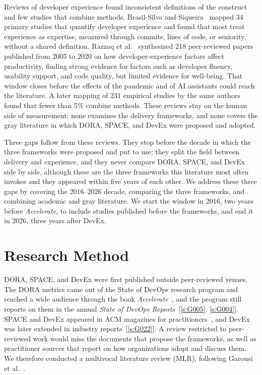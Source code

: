 \documentclass[preprint,number]{elsarticle}
\newcommand{\refG}[1]{\ref{s:#1}}
\begin{document}
Reviews of developer experience found inconsistent definitions of the construct and few studies that combine methods. Brasil-Silva and Siqueira~\cite{P0476} mapped 34 primary studies that quantify developer experience and found that most treat experience as expertise, measured through commits, lines of code, or seniority, without a shared definition. Razzaq et al.~\cite{P0604} synthesized 218 peer-reviewed papers published from 2005 to 2020 on how developer-experience factors affect productivity, finding strong evidence for factors such as developer fluency, usability support, and code quality, but limited evidence for well-being. That window closes before the effects of the pandemic and of AI assistants could reach the literature. A later mapping of 231 empirical studies by the same authors~\cite{P0593} found that fewer than 5\% combine methods. These reviews stay on the human side of measurement: none examines the delivery frameworks, and none covers the gray literature in which DORA, SPACE, and DevEx were proposed and adopted.

Three gaps follow from these reviews. They stop before the decade in which the three frameworks were proposed and put to use; they split the field between delivery and experience, and they never compare DORA, SPACE, and DevEx side by side, although these are the three frameworks this literature most often invokes and they appeared within five years of each other.  We address these three gaps by covering the 2016--2026 decade, comparing the three frameworks, and combining academic and gray literature. We start the window in 2016, two years before \textit{Accelerate}, to include studies published before the frameworks, and end it in 2026, three years after DevEx.

\section{Research Method}
\label{sec:method}

DORA, SPACE, and DevEx were first published outside peer-reviewed venues. The DORA metrics came out of the State of DevOps research program and reached a wide audience through the book \textit{Accelerate}~\cite{forsgren2018accelerate}, and the program still reports on them in the annual \textit{State of DevOps Reports}~[\refG{G005}, \refG{G004}]. SPACE and DevEx appeared in ACM magazines for practitioners~\cite{P1259, P1280}, and DevEx was later extended in industry reports~[\refG{G022}]. A review restricted to peer-reviewed work would miss the documents that propose the frameworks, as well as practitioner sources that report on how organizations adopt and discuss them. We therefore conducted a multivocal literature review (MLR), following Garousi et al.~\cite{garousi2019mlr}.
\end{document}
